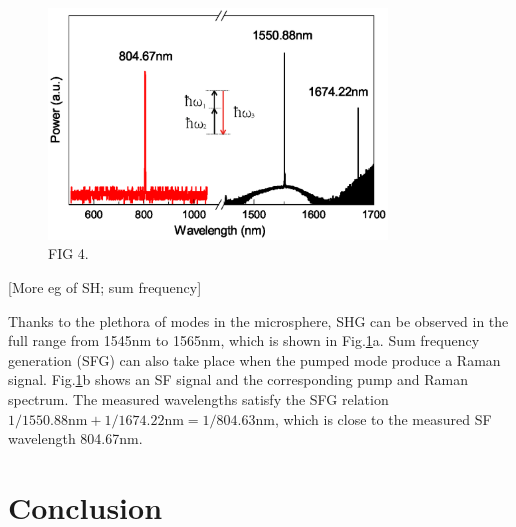 \documentclass[a4paper,8pt,hyperref, twocolumn]{article}
\begin{document}
\begin{figure}[!ht]
\includegraphics[width=9cm]{Fig4.eps}
\caption{FIG 4.}
\label{pic:Fig4}
\end{figure}


[More eg of SH; sum frequency]

Thanks to the plethora of modes in the microsphere, SHG can be observed in the full range from 1545nm to 1565nm, which is shown in Fig.\ref{pic:Fig4}a. Sum frequency generation (SFG) can also take place when the pumped mode produce a Raman signal. Fig.\ref{pic:Fig4}b shows an SF signal and the corresponding pump and Raman spectrum.  The measured wavelengths satisfy the SFG relation $1/1550.88\mathrm{nm} +1/1674.22\mathrm{nm} = 1/804.63\mathrm{nm}$, which is close to the measured SF wavelength 804.67nm.

\section{Conclusion}





\end{document}
